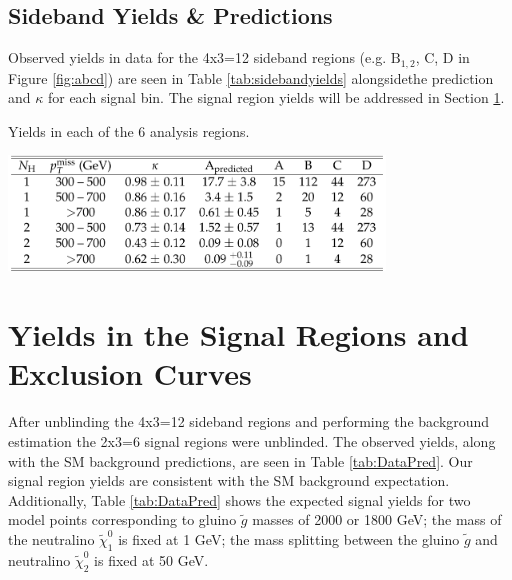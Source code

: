\subsection{Sideband Yields \& Predictions}

Observed yields in data for the 4x3=12 sideband regions (e.g. $\mathrm{B}_{1, 2}$, C, D in Figure \ref{fig:abcd}) are seen in Table \ref{tab:sidebandyields} alongsidethe prediction and $\kappa$ for each signal bin. The signal region yields will be addressed in Section \ref{sec:results}.

\begin{table}
\centering
\caption{Yields in each of the 6 analysis regions.}
\includegraphics[width=0.75\textwidth]{figs/SUS17006/CMS-SUS-17-006_Table-aux_001.pdf}
\label{tab:sidebandyields}
\end{table}



\section{Yields in the Signal Regions and Exclusion Curves}
\label{sec:results}

After unblinding the 4x3=12 sideband regions and performing the background estimation the 2x3=6 signal regions were unblinded. The observed yields, along with the SM background predictions, are seen in Table \ref{tab:DataPred}. Our signal region yields are consistent with the SM background expectation. Additionally, Table \ref{tab:DataPred} shows the expected signal yields for two model points corresponding to gluino $\tilde{g}$ masses of 2000 or 1800 GeV; the mass of the neutralino $\tilde{\chi}_{1}^{0}$ is fixed at 1 GeV; the mass splitting between the gluino $\tilde{g}$ and neutralino $\tilde{\chi}_{2}^{0}$ is fixed at 50 GeV.

